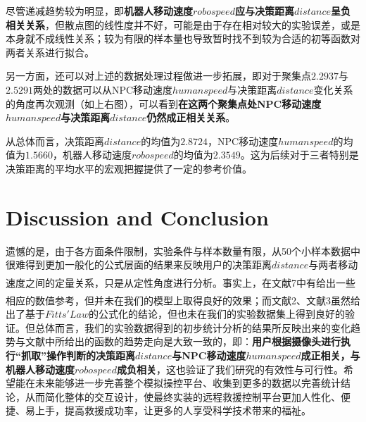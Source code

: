 \documentclass[12pt]{article}  %
\newcommand{\upcite}[1]{\textsuperscript{\textsuperscript{\cite{#1}}}}
\begin{document}
	尽管递减趋势较为明显，即\textbf{机器人移动速度$robospeed$应与决策距离$distance$呈负相关关系}，但散点图的线性度并不好，可能是由于存在相对较大的实验误差，或是本身就不成线性关系；较为有限的样本量也导致暂时找不到较为合适的初等函数对两者关系进行拟合。
	
	另一方面，还可以对上述的数据处理过程做进一步拓展，即对于聚集点$2.2937$与 $2.5291$两处的数据可以从NPC移动速度$humanspeed$与决策距离$distance$变化关系的角度再次观测（如上右图），可以看到\textbf{在这两个聚集点处NPC移动速度$humanspeed$与决策距离$distance$仍然成正相关关系}。
	
	从总体而言，决策距离$distance$的均值为$2.8724$，NPC移动速度$humanspeed$的均值为$1.5660$，机器人移动速度$robospeed$的均值为$2.3549$。这为后续对于三者特别是决策距离的平均水平的宏观把握提供了一定的参考价值。
	
	\section{Discussion and Conclusion}
	遗憾的是，由于各方面条件限制，实验条件与样本数量有限，从50个小样本数据中很难得到更加一般化的公式层面的结果来反映用户的决策距离$distance$与两者移动速度之间的定量关系，只是从定性角度进行分析。事实上，在文献7\upcite{7}中有给出一些相应的数值参考，但并未在我们的模型上取得良好的效果；而文献2\upcite{2}、文献3\upcite{3}虽然给出了基于$Fitts' Law$的公式化的结论，但也未在我们的实验数据集上得到良好的验证。但总体而言，我们的实验数据得到的初步统计分析的结果所反映出来的变化趋势与文献中所给出的函数的趋势走向是大致一致的，即：\textbf{用户根据摄像头进行执行“抓取”操作判断的决策距离$distance$与NPC移动速度$humanspeed$成正相关，与机器人移动速度$robospeed$成负相关}，这也验证了我们研究的有效性与可行性。希望能在未来能够进一步完善整个模拟操控平台、收集到更多的数据以完善统计结论，从而简化整体的交互设计，使最终实装的远程救援控制平台更加人性化、便捷、易上手，提高救援成功率，让更多的人享受科学技术带来的福祉。
	
	\newpage
	
\end{document}
